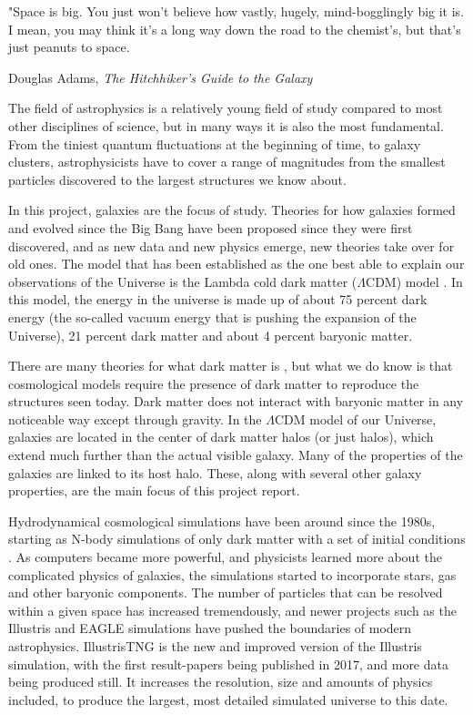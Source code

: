 \epigraph{"Space is big. You just won't believe how vastly, hugely, mind-bogglingly big it is. I mean, you may think it's a long way down the road to the chemist's, but that's just peanuts to space.}{Douglas Adams, \textit{The Hitchhiker's Guide to the Galaxy}}

\noindent
The field of astrophysics is a relatively young field of study compared to most other disciplines of science, but in many ways it is also the most fundamental. From the tiniest quantum fluctuations at the beginning of time, to galaxy clusters, astrophysicists have to cover a range of magnitudes from the smallest particles discovered to the largest structures we know about. 

In this project, galaxies are the focus of study. Theories for how galaxies formed and evolved since the Big Bang have been proposed since they were first discovered, and as new data and new physics emerge, new theories take over for old ones. The model that has been established as the one best able to explain our observations of the Universe is the Lambda cold dark matter ($\Lambda$CDM) model \parencite{white}. In this model, the energy in the universe is made up of about 75 percent dark energy (the so-called vacuum energy that is pushing the expansion of the Universe), 21 percent dark matter and about 4 percent baryonic matter. 

There are many theories for what dark matter is \parencite{Boveia2018}, but what we do know is that cosmological models require the presence of dark matter to reproduce the structures seen today. Dark matter does not interact with baryonic matter in any noticeable way except through gravity. In the $\Lambda$CDM model of our Universe, galaxies are located in the center of dark matter halos (or just halos), which extend much further than the actual visible galaxy. Many of the properties of the galaxies are linked to its host halo. These, along with several other galaxy properties, are the main focus of this project report.

Hydrodynamical cosmological simulations have been around since the 1980s, starting as N-body simulations of only dark matter with a set of initial conditions \parencite{Frenk1983}. As computers became more powerful, and physicists learned more about the complicated physics of galaxies, the simulations started to incorporate stars, gas and other baryonic components. The number of particles that can be resolved within a given space has increased tremendously, and newer projects such as the Illustris and EAGLE simulations have pushed the boundaries of modern astrophysics. IllustrisTNG is the new and improved version of the Illustris simulation, with the first result-papers being published in 2017, and more data being produced still. It increases the resolution, size and amounts of physics included, to produce the largest, most detailed simulated universe to this date. 

